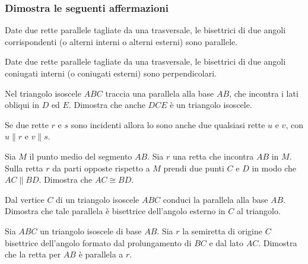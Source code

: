 \subsubsection*{Dimostra le seguenti affermazioni}
\begin{multicols}{2}

\begin{esercizio}
\label{ese:3.21}
Date due rette parallele tagliate da una trasversale, le bisettrici di due angoli corrispondenti (o alterni interni o alterni esterni) sono parallele.
\end{esercizio}

\begin{esercizio}
\label{ese:3.22}
Date due rette parallele tagliate da una trasversale, le bisettrici di due angoli coniugati interni (o coniugati esterni) sono perpendicolari.
\end{esercizio}

\begin{esercizio}
\label{ese:3.23}
Nel triangolo isoscele $ABC$ traccia una parallela alla base $AB$, che incontra i lati obliqui in $D$ ed $E$. Dimostra che anche $DCE$ è un triangolo isoscele.
\end{esercizio}

\begin{esercizio}
\label{ese:3.24}
Se due rette $r$ e $s$ sono incidenti allora lo sono anche due qualsiasi rette $u$ e $v$, con $u \parallel r$ e $v\parallel s$.
\end{esercizio}

\begin{esercizio}
\label{ese:3.25}
Sia $M$ il punto medio del segmento $AB$. Sia $r$ una retta che incontra $AB$ in $M$. Sulla retta $r$ da parti opposte rispetto a $M$ prendi due punti $C$ e $D$ in modo che $AC\parallel BD$. Dimostra che $AC\cong BD$. 
\end{esercizio}

\begin{esercizio}
\label{ese:3.26}
Dal vertice $C$ di un triangolo isoscele $ABC$ conduci la parallela alla base $AB$. Dimostra che tale parallela è bisettrice dell'angolo esterno in $C$ al triangolo.
\end{esercizio}

\begin{esercizio}
\label{ese:3.27}
Sia $ABC$ un triangolo isoscele di base $AB$. Sia $r$ la semiretta di origine $C$ bisettrice dell'angolo formato dal prolungamento di $BC$ e dal lato $AC$. Dimostra che la retta per $AB$ è parallela a $r$.
\end{esercizio}


\end{multicols}
